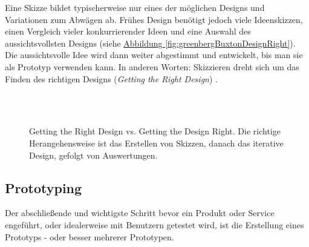 \medskip Eine Skizze bildet typischerweise nur eines der möglichen Designs und Variationen zum Abwägen ab. Frühes Design benötigt jedoch viele Ideenskizzen, einen Vergleich vieler konkurrierender Ideen und eine Auswahl des aussichtsvollsten Designs (siehe \hyperref[fig:greenbergBuxtonDesignRight]{Abbildung \ref*{fig:greenbergBuxtonDesignRight}}). Die aussichtsvolle Idee wird dann weiter abgestimmt und entwickelt, bis man sie als Prototyp verwenden kann. In anderen Worten: Skizzieren dreht sich um das Finden des richtigen Designs (\emph{Getting the Right Design}) \citep{Tohidi:2006, Buxton:2007, Greenberg:2008}. 

\begin{figure}
	\myfloatalign
	 \\
	 \\
	\caption[Getting the Right Design vs. Getting the Design Right. \newline \citep{Greenberg:2008}]{Getting the Right Design vs. Getting the Design Right. Die richtige Herangehensweise ist das Erstellen von Skizzen, danach das iterative Design, gefolgt von Auswertungen.}\label{fig:greenbergBuxtonRightDesign}
\end{figure}

\subsection{Prototyping}
Der abschließende und wichtigste Schritt bevor ein Produkt oder Service engeführt, oder idealerweise mit Benutzern getestet wird, ist die Erstellung eines Prototyps - oder besser mehrerer Prototypen.

